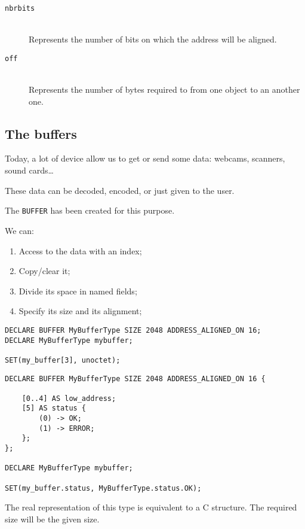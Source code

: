 \documentclass[american]{rtxreport}
\begin{document}
\begin{description}
\item[\texttt{nbrbits}] \hfill \\
	Represents the number of bits on which the address will be aligned.
\item[\texttt{off}] \hfill \\
	Represents the number of bytes required to from one object to an another one.
\end{description}


\subsection{The buffers}

Today, a lot of device allow us to get or send some data: webcams, scanners,
sound cards\ldots

These data can be decoded, encoded, or just given to the user.

The \texttt{BUFFER} has been created for this purpose.

We can:
\begin{enumerate}
	\item Access to the data with an index;
	\item Copy/clear it;
	\item Divide its space in named fields;
	\item Specify its size and its alignment;
\end{enumerate}


\begin{lstlisting}[caption=Déclaration\, instanciation\, utilisation d'une mémoire tampon]
DECLARE BUFFER MyBufferType SIZE 2048 ADDRESS_ALIGNED_ON 16;
DECLARE MyBufferType mybuffer;

SET(my_buffer[3], unoctet);
\end{lstlisting}


\begin{lstlisting}[caption=Déscription du contenu d'une mémoire tampon]
DECLARE BUFFER MyBufferType SIZE 2048 ADDRESS_ALIGNED_ON 16 {

	[0..4] AS low_address;
	[5] AS status {
		(0) -> OK;
		(1) -> ERROR;
	};
};

DECLARE MyBufferType mybuffer;

SET(my_buffer.status, MyBufferType.status.OK);
\end{lstlisting}

The real representation of this type is equivalent to a C structure.
The required size will be the given size.
\end{document}
